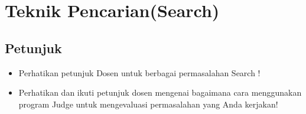 \chapter{Teknik Pencarian(Search)}

\section{Petunjuk}
\begin{itemize}
	\item Perhatikan petunjuk Dosen untuk berbagai permasalahan Search  !
	\
	\item Perhatikan dan ikuti petunjuk dosen mengenai bagaimana cara menggunakan program Judge untuk mengevaluasi permasalahan yang Anda kerjakan!
\end{itemize}

\pagebreak
